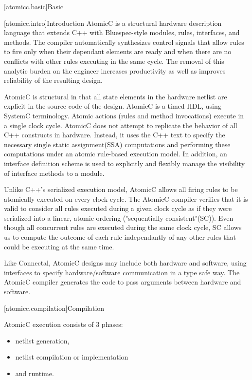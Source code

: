 [atomicc.basic]{Basic}

[atomicc.intro]{Introduction}
AtomicC is a structural hardware description language that extends C++
with Bluespec-style\cite{Bluespec:www,Hoe:Thesis,HoeArvind:TRS_Synthesis2}
modules, rules, interfaces, and methods.
The compiler automatically synthesizes control signals that allow rules to fire
only when their dependant elements are ready and when there are no conflicts with
other rules executing in the same cycle.  The removal of this analytic burden on
the engineer increases productivity as well as improves reliability of the
resulting design.

AtomicC is structural in that all state elements in the hardware
netlist are explicit in the source code of the design. AtomicC is a
timed HDL, using SystemC terminology. 
Atomic actions (rules and method invocations) execute in a single clock cycle.
AtomicC does not attempt to replicate the behavior of all C++ constructs in hardware.
Instead, it uses the C++ text to specify the necessary single static assignment(SSA) computations
and performing these computations under an atomic rule-based execution model.
In addition, an interface definition scheme is used to explicitly and flexibly
manage the visibility of interface methods to a module.

Unlike C++'s serialized execution model, AtomicC allows all firing rules to be atomically executed on
every clock cycle.  The AtomicC compiler verifies that it is valid to consider
all rules executed during a given clock cycle
as if they were serialized into a linear, atomic ordering ("sequentially consistent"(SC)).
Even though all concurrent rules are executed during the same clock cycle, SC allows us to compute the
outcome of each rule independantly of any other rules that could be executing at the same time.

Like Connectal, AtomicC designs may include both hardware and
software, using interfaces to specify hardware/software communication
in a type safe way. The AtomicC compiler generates the code to pass
arguments between hardware and software.

[atomicc.compilation]{Compilation}

AtomicC execution consists of 3 phases:
\begin{itemize}
\item netlist generation, 
\item netlist compilation or implementation
\item and runtime.
\end{itemize}

